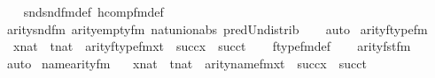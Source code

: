 \begin{isabellebody}
%
\isadelimproof
\ \ %
\endisadelimproof
%
\isatagproof
{}\isamarkupfalse%
\ snd{\isacharunderscore}{\kern0pt}snd{\isacharunderscore}{\kern0pt}fm{\isacharunderscore}{\kern0pt}def\ hcomp{\isacharunderscore}{\kern0pt}fm{\isacharunderscore}{\kern0pt}def\isanewline
\ \ \isamarkupfalse%
\ arity{\isacharunderscore}{\kern0pt}snd{\isacharunderscore}{\kern0pt}fm\ arity{\isacharunderscore}{\kern0pt}empty{\isacharunderscore}{\kern0pt}fm\ nat{\isacharunderscore}{\kern0pt}union{\isacharunderscore}{\kern0pt}abs{}\ pred{\isacharunderscore}{\kern0pt}Un{\isacharunderscore}{\kern0pt}distrib\isanewline
\ \ \isamarkupfalse%
\ auto%
\endisatagproof
{\isafoldproof}%
%
\isadelimproof
\isanewline
%
\endisadelimproof
\isanewline
{}\isamarkupfalse%
\ arity{\isacharunderscore}{\kern0pt}ftype{\isacharunderscore}{\kern0pt}fm\ {\isacharcolon}{\kern0pt}\isanewline
\ \ {\isachardoublequoteopen}{\isasymlbrakk}x{\isasymin}nat\ {\isacharsemicolon}{\kern0pt}\ t{\isasymin}nat{\isasymrbrakk}\ {\isasymLongrightarrow}\ arity{\isacharparenleft}{\kern0pt}ftype{\isacharunderscore}{\kern0pt}fm{\isacharparenleft}{\kern0pt}x{\isacharcomma}{\kern0pt}t{\isacharparenright}{\kern0pt}{\isacharparenright}{\kern0pt}\ {\isacharequal}{\kern0pt}\ succ{\isacharparenleft}{\kern0pt}x{\isacharparenright}{\kern0pt}\ {\isasymunion}\ succ{\isacharparenleft}{\kern0pt}t{\isacharparenright}{\kern0pt}{\isachardoublequoteclose}\isanewline
%
\isadelimproof
\ \ %
\endisadelimproof
%
\isatagproof
{}\isamarkupfalse%
\ ftype{\isacharunderscore}{\kern0pt}fm{\isacharunderscore}{\kern0pt}def\isanewline
\ \ \isamarkupfalse%
\ arity{\isacharunderscore}{\kern0pt}fst{\isacharunderscore}{\kern0pt}fm\ \isanewline
\ \ \isamarkupfalse%
\ auto%
\endisatagproof
{\isafoldproof}%
%
\isadelimproof
\isanewline
%
\endisadelimproof
\isanewline
{}\isamarkupfalse%
\ name{}arity{\isacharunderscore}{\kern0pt}{\isacharunderscore}{\kern0pt}fm\ {\isacharcolon}{\kern0pt}\isanewline
\ \ {\isachardoublequoteopen}{\isasymlbrakk}x{\isasymin}nat\ {\isacharsemicolon}{\kern0pt}\ t{\isasymin}nat{\isasymrbrakk}\ {\isasymLongrightarrow}\ arity{\isacharparenleft}{\kern0pt}name{}{\isacharunderscore}{\kern0pt}fm{\isacharparenleft}{\kern0pt}x{\isacharcomma}{\kern0pt}t{\isacharparenright}{\kern0pt}{\isacharparenright}{\kern0pt}\ {\isacharequal}{\kern0pt}\ succ{\isacharparenleft}{\kern0pt}x{\isacharparenright}{\kern0pt}\ {\isasymunion}\ succ{\isacharparenleft}{\kern0pt}t{\isacharparenright}{\kern0pt}{\isachardoublequoteclose}\isanewline

\end{isabellebody}
